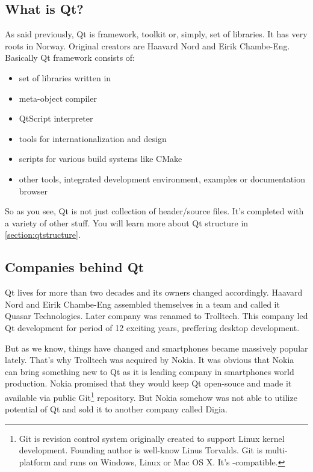 \subsection{What is Qt?}\label{section:what}
As said previously, Qt is framework, toolkit or, simply, set of libraries. It has very roots in Norway. Original creators are Haavard Nord and Eirik Chambe-Eng. Basically Qt framework consists of:
\begin{itemize}
\item set of libraries written in \cpp
\item meta-object compiler
\item QtScript interpreter
\item tools for internationalization and  design
\item scripts for various build systems like CMake
\item other tools, \eg integrated development environment, examples or documentation browser
\end{itemize}

So as you see, Qt is not just collection of header/source files. It's completed with a variety of other stuff. You will learn more about Qt structure in \autoref{section:qtstructure}.

\subsection{Companies behind Qt}
Qt lives for more than two decades and its owners changed accordingly. Haavard Nord and Eirik Chambe-Eng assembled themselves in a team and called it Quasar Technologies. Later company was renamed to Trolltech. This company led Qt development for period of 12 exciting years, preffering desktop development.


But as we know, things have changed and smartphones became massively popular lately. That's why Trolltech was acquired by Nokia. It was obvious that Nokia can bring something new to Qt as it is leading company in smartphones world production. Nokia promised that they would keep Qt open-souce and made it available via public Git\footnote{Git is revision control system originally created to support Linux kernel development. Founding author is well-know Linus Torvalds. Git is multi-platform and runs on Windows, Linux or Mac OS X. It's -compatible.} repository. But Nokia somehow was not able to utilize potential of Qt and sold it to another company called Digia.

